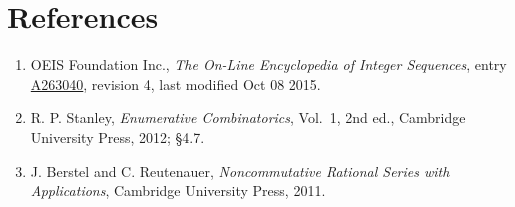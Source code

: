 \documentclass[11pt]{article}
\theoremstyle{definition}
\begin{document}
\section{References}

\begin{enumerate}

\item OEIS Foundation Inc., \emph{The On-Line Encyclopedia of Integer Sequences}, entry \href{https://oeis.org/A263040}{A263040}, revision 4, last modified Oct 08 2015.

\item R. P. Stanley, \emph{Enumerative Combinatorics}, Vol.~1, 2nd ed., Cambridge University Press, 2012; \S4.7.

\item J. Berstel and C. Reutenauer, \emph{Noncommutative Rational Series with Applications}, Cambridge University Press, 2011.

\end{enumerate}
\end{document}
